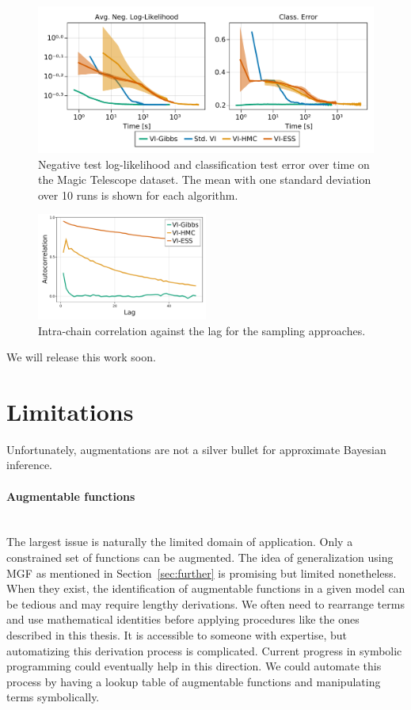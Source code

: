 \begin{figure}[H]
    \centering
    \includegraphics[width=\textwidth]{./chapters/8_discussions/figures/magictelescope.pdf}
    \caption{Negative test log-likelihood and classification test error over time on the Magic Telescope dataset.
    The mean with one standard deviation over 10 runs is shown for each algorithm.
    }
    \label{fig:magictelescope}
\end{figure}

\begin{figure}[H]
    \centering
    \includegraphics[width=0.5\textwidth]{./chapters/8_discussions/figures/magictelescope_autocor.pdf}
    \caption{Intra-chain correlation against the lag for the sampling approaches.}
    \label{fig:magictelescope_autocor}
\end{figure}

We will release this work soon.

\section{Limitations}

Unfortunately, augmentations are not a silver bullet for approximate Bayesian inference.
\paragraph[]{Augmentable functions}\mbox{}\\
The largest issue is naturally the limited domain of application. 
Only a constrained set of functions can be augmented.
The idea of generalization using \ac{MGF} as mentioned in Section~\ref{sec:further} is promising but limited nonetheless.
When they exist, the identification of augmentable functions in a given model can be tedious and may require lengthy derivations.
We often need to rearrange terms and use mathematical identities before applying procedures like the ones described in this thesis.
It is accessible to someone with expertise, but automatizing this derivation process is complicated.
Current progress in symbolic programming could eventually help in this direction.
We could automate this process by having a lookup table of augmentable functions and manipulating terms symbolically.


